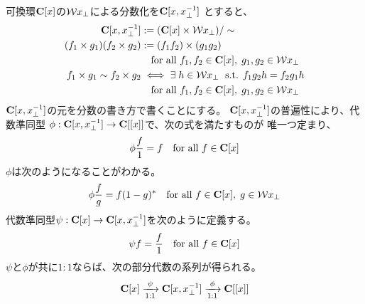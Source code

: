 	可換環$\mathbf{C}[x]$の${{\mathcal{W}}} x_\perp$による分数化を$\mathbf{C}[x,x_\perp^{-1}]$
	とすると、
	\begin{equation*}\begin{split}
		\mathbf{C}[x,x_\perp^{-1}] &:= (\mathbf{C}[x]\times {\ensuremath{{\mathcal{W}}}} x_\perp) / \sim \\
		(f_1\times g_1)(f_2\times g_2) &:= (f_1f_2)\times(g_1g_2) \\
		& \quad\text{for all }f_1,f_2\in\mathbf{C}[x],\;g_1,g_2\in {\ensuremath{{\mathcal{W}}}} x_\perp \\
		f_1\times g_1 \sim f_2\times g_2 &\iff \exists\; h\in {\ensuremath{{\mathcal{W}}}} x_\perp
		\; \text{ s.t. } f_1g_2h = f_2g_1h \\
		& \quad\text{for all }f_1,f_2\in\mathbf{C}[x],\;g_1,g_2\in {\ensuremath{{\mathcal{W}}}} x_\perp \\
	\end{split}\end{equation*}
	$\mathbf{C}[x,x_\perp^{-1}]$の元を分数の書き方で書くことにする。
	$\mathbf{C}[x,x_\perp^{-1}]$の普遍性により、代数準同型
	$\phi:\mathbf{C}[x,x_\perp^{-1}]\to\mathbf{C}[[x]]$で、次の式を満たすものが
	唯一つ定まり、
	\begin{equation*}\begin{split}
		\phi\frac{f}{1} = f \quad\text{for all } f\in \mathbf{C}[x]
	\end{split}\end{equation*}
	$\phi$は次のようになることがわかる。
	\begin{equation*}\begin{split}
		\phi\frac{f}{g} = f(1 - g)^*
		\quad\text{for all }f\in\mathbf{C}[x],\; g\in {\ensuremath{{\mathcal{W}}}} x_\perp \\
	\end{split}\end{equation*}
	代数準同型$\psi:\mathbf{C}[x]\to\mathbf{C}[x,x_\perp^{-1}]$を次のように定義する。
	\begin{equation*}\begin{split}
		\psi f = \frac{f}{1} \quad\text{for all } f\in \mathbf{C}[x]
	\end{split}\end{equation*}
	$\psi$と$\phi$が共に$1:1$ならば、次の部分代数の系列が得られる。
	\begin{equation*}\begin{split}
		\mathbf{C}[x] \xrightarrow[{1:1}]{\psi} \mathbf{C}[x,x_\perp^{-1}]
		\xrightarrow[{1:1}]{\phi} \mathbf{C}[[x]]
	\end{split}\end{equation*}

